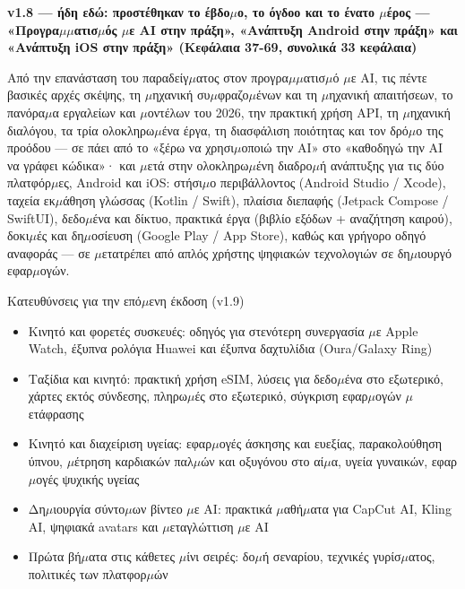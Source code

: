 

\textbf{v1.8 — ήδη εδώ: προστέθηκαν το έβδο$\mu$ο, το όγδοο και το ένατο $\mu$έρος — «Προγρα$\mu$$\mu$ατισ$\mu$ός $\mu$ε AI στην πράξη», «Ανάπτυξη Android στην πράξη» και «Ανάπτυξη iOS στην πράξη» (Κεφάλαια 37-69, συνολικά 33 κεφάλαια)}\par

Από την επανάσταση του παραδείγ$\mu$ατος στον προγρα$\mu$$\mu$ατισ$\mu$ό $\mu$ε AI, τις πέντε βασικές αρχές σκέψης, τη $\mu$ηχανική συ$\mu$φραζο$\mu$ένων και τη $\mu$ηχανική απαιτήσεων, το πανόρα$\mu$α εργαλείων και $\mu$οντέλων του 2026, την πρακτική χρήση API, τη $\mu$ηχανική διαλόγου, τα τρία ολοκληρω$\mu$ένα έργα, τη διασφάλιση ποιότητας και τον δρό$\mu$ο της προόδου — σε πάει από το «ξέρω να χρησι$\mu$οποιώ την AI» στο «καθοδηγώ την AI να γράφει κώδικα»· και $\mu$ετά στην ολοκληρω$\mu$ένη διαδρο$\mu$ή ανάπτυξης για τις δύο πλατφόρ$\mu$ες, Android και iOS: στήσι$\mu$ο περιβάλλοντος (Android Studio / Xcode), ταχεία εκ$\mu$άθηση γλώσσας (Kotlin / Swift), πλαίσια διεπαφής (Jetpack Compose / SwiftUI), δεδο$\mu$ένα και δίκτυο, πρακτικά έργα (βιβλίο εξόδων + αναζήτηση καιρού), δοκι$\mu$ές και δη$\mu$οσίευση (Google Play / App Store), καθώς και γρήγορο οδηγό αναφοράς — σε $\mu$ετατρέπει από απλός χρήστης ψηφιακών τεχνολογιών σε δη$\mu$ιουργό εφαρ$\mu$ογών.

\begin{tcbinfo}{Κατευθύνσεις για την επό$\mu$ενη έκδοση (v1.9)}
\begin{itemize}
  \item Κινητό και φορετές συσκευές: οδηγός για στενότερη συνεργασία $\mu$ε Apple Watch, έξυπνα ρολόγια Huawei και έξυπνα δαχτυλίδια (Oura/Galaxy Ring)
  \item Ταξίδια και κινητό: πρακτική χρήση eSIM, λύσεις για δεδο$\mu$ένα στο εξωτερικό, χάρτες εκτός σύνδεσης, πληρω$\mu$ές στο εξωτερικό, σύγκριση εφαρ$\mu$ογών $\mu$ετάφρασης
  \item Κινητό και διαχείριση υγείας: εφαρ$\mu$ογές άσκησης και ευεξίας, παρακολούθηση ύπνου, $\mu$έτρηση καρδιακών παλ$\mu$ών και οξυγόνου στο αί$\mu$α, υγεία γυναικών, εφαρ$\mu$ογές ψυχικής υγείας
  \item Δη$\mu$ιουργία σύντο$\mu$ων βίντεο $\mu$ε AI: πρακτικά $\mu$αθή$\mu$ατα για CapCut AI, Kling AI, ψηφιακά avatars και $\mu$εταγλώττιση $\mu$ε AI
  \item Πρώτα βή$\mu$ατα στις κάθετες $\mu$ίνι σειρές: δο$\mu$ή σεναρίου, τεχνικές γυρίσ$\mu$ατος, πολιτικές των πλατφορ$\mu$ών
\end{itemize}

\end{tcbinfo}

